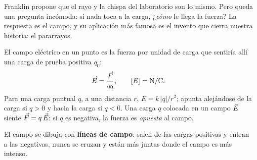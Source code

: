 \documentclass[11pt]{article}
\begin{document}
\label{tema:campo}

\begin{hilo}
Franklin propone que el rayo y la chispa del laboratorio son lo mismo. Pero
queda una pregunta incómoda: si nada toca a la carga, ¿\emph{cómo} le llega la
fuerza? La respuesta es el campo, y su aplicación más famosa es el invento que
cierra nuestra historia: el pararrayos.
\end{hilo}

\begin{definicion}
El campo eléctrico en un punto es la fuerza por unidad de carga que sentiría
allí una carga de prueba positiva $q_0$:
\[
  \vect{E} = \frac{\vect{F}}{q_0}, \qquad [E] = \unit{N/C}.
\]
Para una carga puntual $q$, a una distancia $r$, $E = k\,|q|/r^{2}$; apunta
alejándose de la carga si $q > 0$ y hacia la carga si $q < 0$. Una carga $q$
colocada en un campo $\vec{E}$ siente $\vec{F} = q\,\vec{E}$: si $q$ es
negativa, la fuerza es \emph{opuesta} al campo.
\end{definicion}

El campo se dibuja con \textbf{líneas de campo}: salen de las cargas positivas
y entran a las negativas, nunca se cruzan y están más juntas donde el campo es
más intenso.
\end{document}
